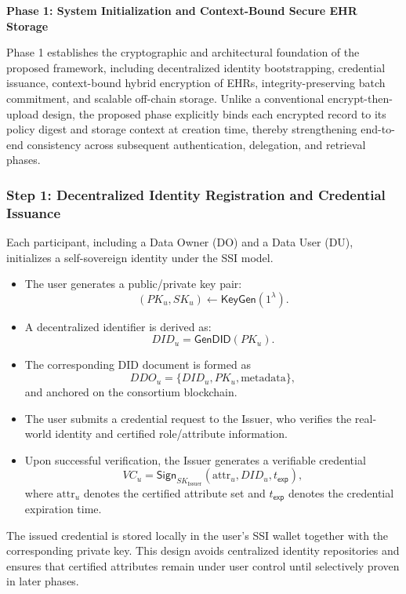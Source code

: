 \documentclass[conference]{IEEEtran}
\begin{document}
\textbf{Phase 1: System Initialization and Context-Bound Secure EHR Storage}
\label{sec:phase1}

Phase 1 establishes the cryptographic and architectural foundation of the proposed framework, including decentralized identity bootstrapping, credential issuance, context-bound hybrid encryption of EHRs, integrity-preserving batch commitment, and scalable off-chain storage. Unlike a conventional encrypt-then-upload design, the proposed phase explicitly binds each encrypted record to its policy digest and storage context at creation time, thereby strengthening end-to-end consistency across subsequent authentication, delegation, and retrieval phases.

\subsubsection*{Step 1: Decentralized Identity Registration and Credential Issuance}

Each participant, including a Data Owner (DO) and a Data User (DU), initializes a self-sovereign identity under the SSI model.

\begin{itemize}
    \item The user generates a public/private key pair:
    \[
    (PK_u, SK_u) \leftarrow \textsf{KeyGen}(1^\lambda).
    \]
    
    \item A decentralized identifier is derived as:
    \[
    DID_u = \textsf{GenDID}(PK_u).
    \]
    
    \item The corresponding DID document is formed as
    \[
    DDO_u = \{DID_u, PK_u, \text{metadata}\},
    \]
    and anchored on the consortium blockchain.

    \item The user submits a credential request to the Issuer, who verifies the real-world identity and certified role/attribute information.

    \item Upon successful verification, the Issuer generates a verifiable credential
    \[
    VC_u = \textsf{Sign}_{SK_{\text{Issuer}}}(\text{attr}_u, DID_u, t_{\mathsf{exp}}),
    \]
    where $\text{attr}_u$ denotes the certified attribute set and $t_{\mathsf{exp}}$ denotes the credential expiration time.
\end{itemize}

The issued credential is stored locally in the user’s SSI wallet together with the corresponding private key. This design avoids centralized identity repositories and ensures that certified attributes remain under user control until selectively proven in later phases.
\end{document}
